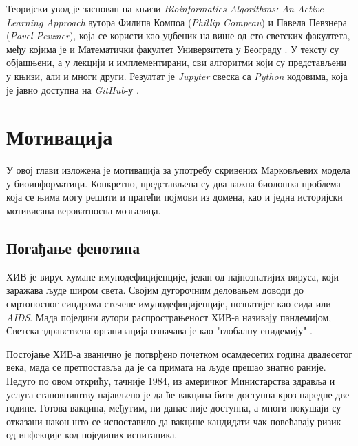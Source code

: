 \documentclass[12pt,oneside]{memoir}
\begin{document}
\begin{CJK}{UTF8}{ipxm}
Теоријски увод је заснован на књизи \textit{Bioinformatics Algorithms: An Active Learning Approach} \cite{compeau2015} аутора Филипа Компоа (\textit{Phillip Compeau}) и Павела Певзнера (\textit{Pavel Pevzner}), која се користи као уџбеник на више од сто светских факултета, међу којима је и Математички факултет Универзитета у Београду \cite{matf}. У тексту су објашњени, а у лекцији и имплементирани, сви алгоритми који су представљени у књизи, али и многи други. Резултат је \textit{Jupyter} свеска са \textit{Python} кодовима, која је јавно доступна на \textit{GitHub}-у \cite{vasovich2021}.

\chapter{Мотивација}
У овој глави изложена је мотивација за употребу скривених Марковљевих модела у биоинформатици. Конкретно, представљена су два важна биолошка проблема која се њима могу решити и пратећи појмови из домена, као и једна историјски мотивисана вероватносна мозгалица.

\section{Погађање фенотипа}
ХИВ је вирус хумане имунодефицијенције, један од најпознатијих вируса, који заражава људе широм света. Својим дугорочним деловањем доводи до смртоносног синдрома стечене имунодефицијенције, познатијег као сида или \textit{AIDS}. Мада поједини аутори распрострањеност ХИВ-а називају пандемијом, Светска здравствена организација означава је као "глобалну епидемију" \cite{who}.

Постојање ХИВ-а званично је потврђено почетком осамдесетих година двадесетог века, мада се претпоставља да је са примата на људе прешао знатно раније. Недуго по овом открићу, тачније 1984, из америчког Министарства здравља и услуга становништву најављено је да ће вакцина бити доступна кроз наредне две године. Готова вакцина, међутим, ни данас није доступна, а многи покушаји су отказани након што се испоставило да вакцине кандидати чак повећавају ризик од инфекције код појединих испитаника.


\end{CJK}
\end{document}
